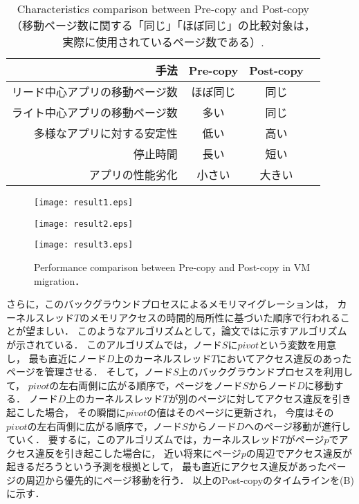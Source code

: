 \documentclass[10pt]{jsarticle}
\begin{document}
\begin{table}
  \centering
  \caption{Characteristics comparison between Pre-copy and Post-copy
    （移動ページ数に関する「同じ」「ほぼ同じ」の比較対象は，
    実際に使用されているページ数である）.}
  \label{tab:copy}
  \begin{tabular}{rccc}\hline
    手法&Pre-copy&Post-copy\\\hline
    リード中心アプリの移動ページ数&ほぼ同じ&同じ\\
    ライト中心アプリの移動ページ数&多い&同じ\\
    多様なアプリに対する安定性&低い&高い\\
    停止時間&長い&短い\\
    アプリの性能劣化&小さい&大きい\\\hline
  \end{tabular}
\end{table}

\begin{figure*}
  \centering
  \begin{minipage}{0.32\hsize}
    \texttt{[image: result1.eps]}
  \end{minipage}
  \begin{minipage}{0.32\hsize}
    \texttt{[image: result2.eps]}
  \end{minipage}
  \begin{minipage}{0.32\hsize}
    \texttt{[image: result3.eps]}
  \end{minipage}
  \caption{Performance comparison between Pre-copy and Post-copy in VM migration\cite{t1}．}
  \label{fig:result}
\end{figure*}

さらに，このバックグラウンドプロセスによるメモリマイグレーションは，
カーネルスレッド$T$のメモリアクセスの時間的局所性に基づいた順序で行われることが望ましい．
このようなアルゴリズムとして，論文\cite{t1}ではに示すアルゴリズムが示されている．
このアルゴリズムでは，ノード$S$に$pivot$という変数を用意し，
最も直近にノード$D$上のカーネルスレッド$T$においてアクセス違反のあったページを管理させる．
そして，ノード$S$上のバックグラウンドプロセスを利用して，
$pivot$の左右両側に広がる順序で，ページをノード$S$からノード$D$に移動する．
ノード$D$上のカーネルスレッド$T$が別のページに対してアクセス違反を引き起こした場合，
その瞬間に$pivot$の値はそのページに更新され，
今度はその$pivot$の左右両側に広がる順序で，ノード$S$からノード$D$へのページ移動が進行していく．
要するに，このアルゴリズムでは，カーネルスレッド$T$がページ$p$でアクセス違反を引き起こした場合に，
近い将来にページ$p$の周辺でアクセス違反が起きるだろうという予測を根拠として，
最も直近にアクセス違反があったページの周辺から優先的にページ移動を行う．
以上のPost-copyのタイムラインを(B)に示す．
\end{document}
